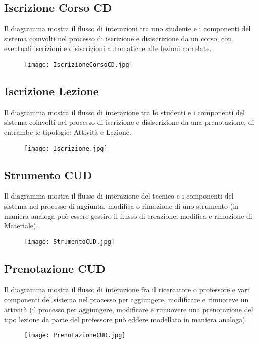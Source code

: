 \documentclass[11pt,a4paper]{report}
\begin{document}
\subsection{Iscrizione Corso CD}
Il diagramma mostra il flusso di interazioni tra uno studente e i componenti del sistema coinvolti nel processo di iscrizione e disiscrizione da un corso, con eventuali iscrizioni e disiscrizioni automatiche alle lezioni correlate.
\begin{figure}[h!]
  \centering
\texttt{[image: IscrizioneCorsoCD.jpg]}
\end{figure}
\newpage

\subsection{Iscrizione Lezione}
Il diagramma mostra il flusso di interazione tra lo studenti e i componenti del sistema coinvolti nel processo di iscrizione e disiscrizione da una prenotazione, di entrambe le tipologie: Attività e Lezione. 
\begin{figure}[h!]
  \centering
\texttt{[image: Iscrizione.jpg]}
\end{figure}

\newpage

\subsection{Strumento CUD}
Il diagramma mostra il flusso di interazione del tecnico e i componenti del sistema nel processo di aggiunta, modifica o rimozione di uno strumento (in maniera analoga può essere gestiro il flusso di creazione, modifica e rimozione di Materiale).
\begin{figure}[h!]
  \centering
\texttt{[image: StrumentoCUD.jpg]}
\end{figure}
\newpage

\subsection{Prenotazione CUD}
Il diagramma mostra il flusso di interazione fra il ricercatore o professore e vari componenti del sistema nel processo per aggiungere, modificare e rimuoreve un attività (il processo per aggiungere, modificare e rimuovere una prenotazione del tipo lezione da parte del professore può eddere modellato in maniera analoga).
\begin{figure}[h!]
  \centering
\texttt{[image: PrenotazioneCUD.jpg]}
\end{figure}
\newpage
\end{document}
